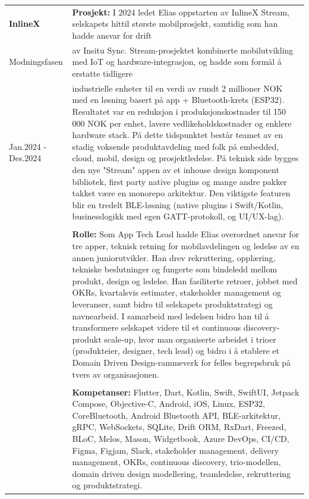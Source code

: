 \documentclass[a4paper,10pt]{article}
\begin{document}
\noindent
\begin{longtable}{@{}p{4cm}p{11cm}@{}}  %
\textbf{InlineX}
& \textbf{Prosjekt:} I 2024 ledet Elias oppstarten av InlineX Stream, selskapets hittil største mobilprosjekt, samtidig som han hadde ansvar for drift \\
Modningsfasen & av Insitu Sync. Stream-prosjektet kombinerte mobilutvikling med IoT og hardware-integrasjon, og hadde som formål å erstatte tidligere \\
Jan.2024 - Des.2024 & industrielle enheter til en verdi av rundt 2 millioner NOK med en løsning basert på app + Bluetooth-krets (ESP32). Resultatet var en reduksjon i produksjonskostnader til 150 000 NOK per enhet, lavere vedlikeholdskostnader og enklere hardware stack. På dette tidspunktet består teamet av en stadig voksende produktavdeling med folk på embedded, cloud, mobil, design og prosjektledelse. På teknisk side bygges den nye "Stream" appen av et inhouse design komponent bibliotek, first party native plugins og mange andre pakker takket være en monorepo arkitektur. Den viktigste featuren blir en tredelt BLE-løsning (native plugins i Swift/Kotlin, businesslogikk med egen GATT-protokoll, og UI/UX-lag).\\
& \\
&  \textbf{Rolle:} Som App Tech Lead hadde Elias overordnet ansvar for tre apper, teknisk retning for mobilavdelingen og ledelse av en annen juniorutvikler. Han drev rekruttering, opplæring, tekniske beslutninger og fungerte som bindeledd mellom produkt, design og ledelse. Han fasiliterte retroer, jobbet med OKRs, kvartalsvis estimater, stakeholder management og leveranser, samt bidro til selskapets produktstrategi og navnearbeid. I samarbeid med ledelsen bidro han til å transformere selskapet videre til et continuous discovery-produkt scale-up, hvor man organiserte arbeidet i trioer (produkteier, designer, tech lead) og bidro i å etablere et Domain Driven Design-rammeverk for felles begrepsbruk på tvers av organisasjonen. \\
& \\
& \textbf{Kompetanser:} Flutter, Dart, Kotlin, Swift, SwiftUI, Jetpack Compose, Objective-C, Android, iOS, Linux, ESP32, CoreBluetooth, Android Bluetooth API, BLE-arkitektur, gRPC, WebSockets, SQLite, Drift ORM, RxDart, Freezed, BLoC, Melos, Mason, Widgetbook, Azure DevOps, CI/CD, Figma, Figjam, Slack, stakeholder management, delivery management, OKRs, continuous discovery, trio-modellen, domain driven design modellering, teamledelse, rekruttering og produktstrategi.\\
\end{longtable}
\end{document}
